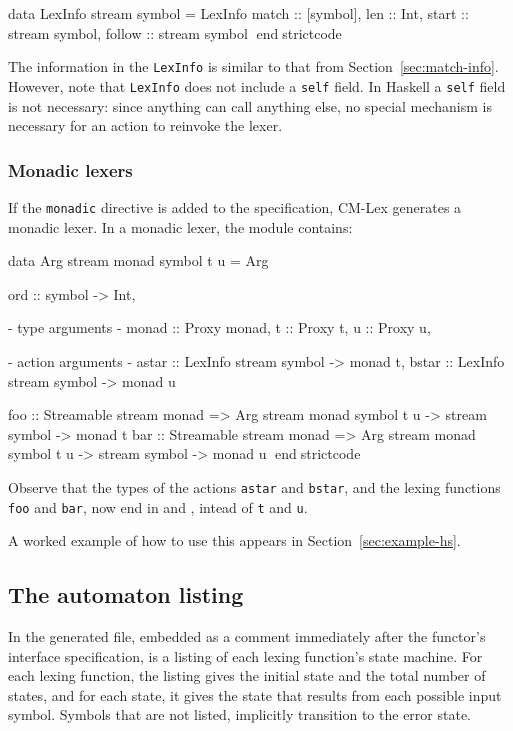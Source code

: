 \documentclass[10pt]{article}
\begin{document}
\begin{strictcode}
\begin{strictcode}
\begin{strictcode}
data LexInfo stream symbol =
   LexInfo
   { match :: [symbol],
     len :: Int,
     start :: stream symbol,
     follow :: stream symbol }
endstrictcode

The information in the {\tt LexInfo} is similar to that from
Section~\ref{sec:match-info}.  However, note that {\tt LexInfo} does
not include a {\tt self} field.  In Haskell a {\tt self} field is not
necessary: since anything can call anything else, no special mechanism
is necessary for an action to reinvoke the lexer.


\subsubsection{Monadic lexers}

If the {\tt monadic} directive is added to the specification, CM-Lex
generates a monadic lexer.  In a monadic lexer, the module contains:

\begin{strictcode}
data Arg stream monad symbol t u =
   Arg { ord :: symbol -> Int,

         {- type arguments -}
         monad :: Proxy monad,
         t :: Proxy t,
         u :: Proxy u,

         {- action arguments -}
         astar :: LexInfo stream symbol -> monad t,
         bstar :: LexInfo stream symbol -> monad u }

foo :: Streamable stream monad
       => Arg stream monad symbol t u -> stream symbol -> monad t
bar :: Streamable stream monad
       => Arg stream monad symbol t u -> stream symbol -> monad u
endstrictcode

Observe that the types of the actions {\tt astar} and {\tt bstar}, and
the lexing functions {\tt foo} and {\tt bar}, now end in  and , intead of {\tt t} and {\tt u}.

A worked example of how to use this appears in Section~\ref{sec:example-hs}.



\subsection{The automaton listing}

In the generated file, embedded as a comment immediately after the
functor's interface specification, is a listing of each lexing
function's state machine.  For each lexing function, the listing gives
the initial state and the total number of states, and for each state,
it gives the state that results from each possible input symbol.
Symbols that are not listed, implicitly transition to the error
state.




\end{strictcode}
\end{strictcode}
\end{strictcode}
\end{strictcode}
\end{document}
